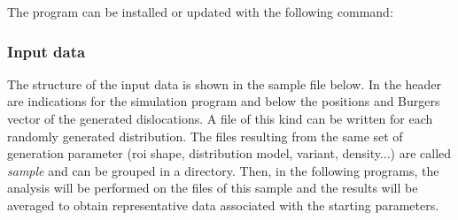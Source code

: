 The program can be installed or updated with the following command:


\subsubsection{Input data}

The structure of the input data is shown in the sample file below.
In the header are indications for the simulation program and below the positions and Burgers vector of the generated dislocations.
A file of this kind can be written for each randomly generated distribution.
The files resulting from the same set of generation parameter (\gls{roi} shape, distribution model, variant, density...) are called \textit{sample} and can be grouped in a directory.
Then, in the following programs, the analysis will be performed on the files of this sample and the results will be averaged to obtain representative data associated with the starting parameters.

